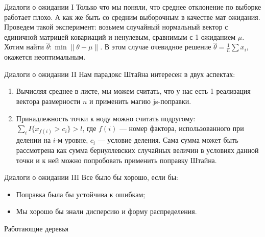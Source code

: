 \documentclass[14pt, fleqn, xcolor={dvipsnames, table}]{beamer}
\begin{document}
\begin{frame}{Диалоги о ожидании I} %
Только что мы поняли, что среднее отклонение по выборке работает плохо. А как же быть со средним выборочным в качестве мат ожидания. \\
Проведем такой эксперимент: возьмем случайный нормальный вектор с единичной матрицей ковариаций и ненулевым, сравнимым с 1 ожиданием $\mu$. Хотим найти $\hat{\theta}: \min \|\theta - \mu\|$. В этом случае очевидное решение $\hat{\theta} = \frac{1}{n}\sum x_i$, окажется неоптимальным. %
\end{frame}

\begin{frame}{Диалоги о ожидании II} 
Нам парадокс Штайна интересен в двух аспектах:
\begin{enumerate}
  \item Вычисляя среднее в листе, мы можем считать, что у нас есть 1 реализация вектора размерности $n$ и применить магию js-поправки.
  \item Принадлежность точки к ноду можно считать подругому: $\sum_i I\{x_{f(i)} > c_i\} > l$, где $f(i)$ --- номер фактора, использованного при делении на $i$-м уровне, $c_i$ --- условие деления. Сама сумма может быть рассмотрена как сумма бернуллевских случайных величин в условиях данной точки и к ней можно попробовать применить поправку Штайна.
\end{enumerate}
\end{frame}

\begin{frame}{Диалоги о ожидании III} %
Все было бы хорошо, если бы:
\begin{itemize}
  \item Поправка была бы устойчива к ошибкам; %
  \item Мы хорошо бы знали дисперсию и форму распределения.
\end{itemize}
\end{frame}

\begin{frame}{Работающие деревья}
\large
\center
{}
\end{frame}

\end{document}
